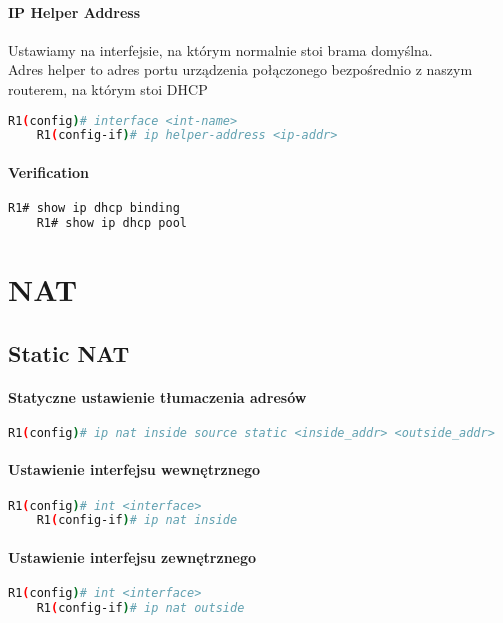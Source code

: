 \documentclass[12pt]{article}
\begin{document}
	\paragraph{IP Helper Address\\}
	
	Ustawiamy na interfejsie, na którym normalnie stoi brama domyślna.\\
	Adres helper to adres portu urządzenia połączonego bezpośrednio z naszym routerem, na którym stoi DHCP
	\begin{lstlisting}[language=bash]
	R1(config)# interface <int-name>
	R1(config-if)# ip helper-address <ip-addr>
	\end{lstlisting}
	
	\paragraph{Verification}
	\begin{lstlisting}[language=bash]
	R1# show ip dhcp binding
	R1# show ip dhcp pool
	\end{lstlisting}

\newpage		

\section{NAT}
	\subsection{Static NAT}
	\paragraph{Statyczne ustawienie tłumaczenia adresów}
	\begin{lstlisting}[language=bash]
	R1(config)# ip nat inside source static <inside_addr> <outside_addr>
	\end{lstlisting}
	\paragraph{Ustawienie interfejsu wewnętrznego}
	\begin{lstlisting}[language=bash]
	R1(config)# int <interface>
	R1(config-if)# ip nat inside
	\end{lstlisting}
	\paragraph{Ustawienie interfejsu zewnętrznego}
	\begin{lstlisting}[language=bash]
	R1(config)# int <interface>
	R1(config-if)# ip nat outside
	\end{lstlisting}
	
\end{document}
